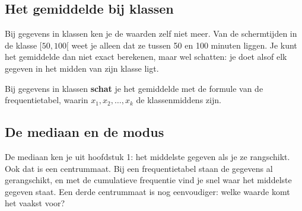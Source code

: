 \begin{oefeningen}
\end{oefeningen}

\subsection{Het gemiddelde bij klassen}

Bij gegevens in klassen ken je de waarden zelf niet meer. Van de schermtijden in de klasse $[50, 100[$ weet je alleen dat ze tussen 50 en 100 minuten liggen. Je kunt het gemiddelde dan niet exact berekenen, maar wel schatten: je doet alsof elk gegeven in het midden van zijn klasse ligt.

\begin{theorie}
Bij gegevens in klassen \textbf{\textcolor{accent}{schat}} je het gemiddelde met de formule van de frequentietabel, waarin $x_1, x_2, \dots, x_k$ de klassenmiddens zijn.
\end{theorie}


\begin{oefeningen}
\end{oefeningen}

\subsection{De mediaan en de modus}

De mediaan ken je uit hoofdstuk 1: het middelste gegeven als je ze rangschikt. Ook dat is een centrummaat. Bij een frequentietabel staan de gegevens al gerangschikt, en met de cumulatieve frequentie vind je snel waar het middelste gegeven staat. Een derde centrummaat is nog eenvoudiger: welke waarde komt het vaakst voor?

